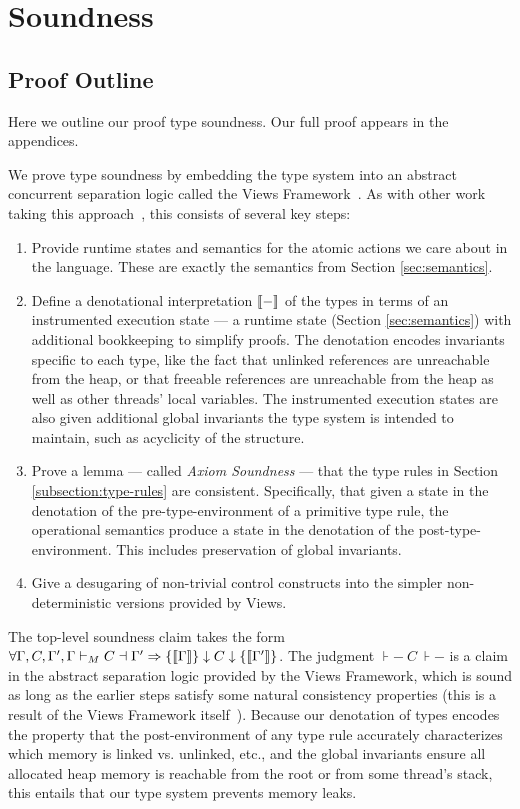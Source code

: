\section{Soundness}
\label{sec:soundness}
\subsection{Proof Outline}
Here we outline our proof type soundness.  Our full proof appears in the appendices.

We prove type soundness by embedding the type system into an abstract concurrent separation logic called the Views Framework~\cite{views}.  As with other work taking this approach~\cite{oopsla12,toplas17}, this consists of several key steps:
\begin{enumerate}
    \item Provide runtime states and semantics for the atomic actions we care about in the language.  These are exactly the semantics from Section \ref{sec:semantics}.
    \item Define a denotational interpretation $\llbracket-\rrbracket$ of the types in terms of an instrumented execution state --- a runtime state (Section \ref{sec:semantics}) with additional bookkeeping to simplify proofs.
    The denotation encodes invariants specific to each type, like the fact that \textsf{unlinked} references are unreachable from the heap, or that \textsf{freeable} references are unreachable from the heap as well as other threads' local variables.
    The instrumented execution states are also given additional global invariants the type system is intended to maintain, such as acyclicity of the structure.
    \item Prove a lemma --- called \emph{Axiom Soundness} --- that the type rules in Section \ref{subsection:type-rules} are consistent.  Specifically, that given a state in the denotation of the pre-type-environment of a primitive type rule, the operational semantics produce a state in the denotation of the post-type-environment.  This includes preservation of global invariants.
    \item Give a desugaring of non-trivial control constructs into the simpler non-deterministic versions provided by Views.
\end{enumerate}
The top-level soundness claim takes the form
$
    \forall \Gamma,C,\Gamma', \Gamma\vdash_M C \dashv \Gamma' \Rightarrow \{\llbracket\Gamma\rrbracket\}\downarrow C\downarrow\{\llbracket\Gamma'\rrbracket\}
$.
The judgment $\assert{-}~C~\assert{-}$ is a claim in the abstract separation logic provided by the Views Framework, which is sound as long as the earlier steps satisfy some natural consistency properties (this is a result of the Views Framework itself~\cite{views}).
Because our denotation of types encodes the property that the post-environment of any type rule accurately characterizes which memory is linked vs. unlinked, etc., and the global invariants ensure all allocated heap memory is reachable from the root or from some thread's stack, this entails that our type system prevents memory leaks.
